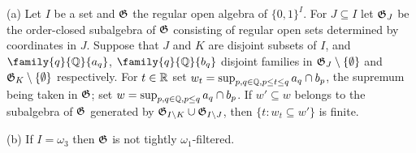  (a) Let $I$ be a set and $\frak G$ the regular open
algebra of $\{0,1\}^I$.   For $J\subseteq I$ let $\frak G_J$ be the
order-closed subalgebra of $\frak G$ consisting of regular open sets
determined by coordinates in $J$.   Suppose that $J$ and $K$ are
disjoint subsets of $I$, and $\family{q}{\Bbb Q}{a_q}$,
$\family{q}{\Bbb Q}{b_q}$ disjoint families in
$\frak G_J\setminus\{\emptyset\}$ and
$\frak G_K\setminus\{\emptyset\}$ respectively.   For $t\in\Bbb R$ set
$w_t=\sup_{p,q\in\Bbb Q,p\le t\le q}a_q\cap b_p$, the supremum being
taken in $\frak G$;  set $w=\sup_{p,q\in\Bbb Q,p\le q}a_q\cap b_p$.
If $w'\subseteq w$ belongs to the subalgebra of $\frak G$ generated by
$\frak G_{I\setminus K}\cup\frak G_{I\setminus J}$, then
$\{t:w_t\subseteq w'\}$ is finite.

(b) If $I=\omega_3$ then $\frak G$ is not tightly
$\omega_1$-filtered.

